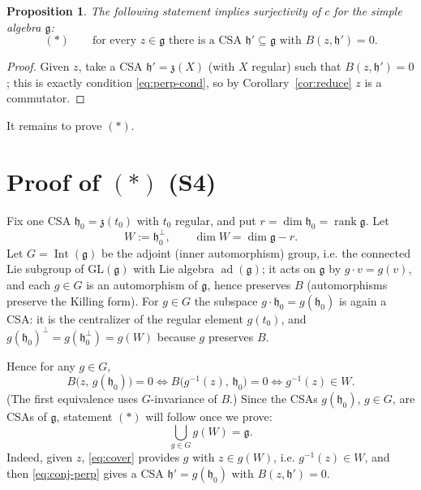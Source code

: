 \documentclass{amsart}
\newtheorem{proposition}{Proposition}
\theoremstyle{definition}
\begin{document}
\begin{proposition}\label{prop:S3}
The following statement implies surjectivity of $c$ for the simple algebra
$\mathfrak g$:
\[
  (\ast)\qquad \text{for every }z\in\mathfrak g\text{ there is a CSA }
  \mathfrak h'\subseteq\mathfrak g\text{ with } B(z,\mathfrak h')=0 .
\]
\end{proposition}

\begin{proof}
Given $z$, take a CSA $\mathfrak h'=\mathfrak z(X)$ (with $X$ regular) such that
$B(z,\mathfrak h')=0$; this is exactly condition \eqref{eq:perp-cond}, so by
Corollary~\ref{cor:reduce} $z$ is a commutator.
\end{proof}

It remains to prove $(\ast)$.

\section{Proof of $(\ast)$ (S4)}

Fix one CSA $\mathfrak h_0=\mathfrak z(t_0)$ with $t_0$ regular, and put
$r=\dim\mathfrak h_0=\operatorname{rank}\mathfrak g$. Let
\[
  W:=\mathfrak h_0^{\perp},\qquad \dim W=\dim\mathfrak g-r .
\]
Let $G=\operatorname{Int}(\mathfrak g)$ be the adjoint (inner automorphism) group,
i.e. the connected Lie subgroup of $\mathrm{GL}(\mathfrak g)$ with Lie algebra
$\operatorname{ad}(\mathfrak g)$; it acts on $\mathfrak g$ by
$g\cdot v=g(v)$, and each $g\in G$ is an automorphism of $\mathfrak g$, hence
preserves $B$ (automorphisms preserve the Killing form). For $g\in G$ the subspace
$g\cdot\mathfrak h_0=g(\mathfrak h_0)$ is again a CSA: it is the centralizer of the
regular element $g(t_0)$, and $g(\mathfrak h_0)^{\perp}=g(\mathfrak h_0^{\perp})
=g(W)$ because $g$ preserves $B$.

Hence for any $g\in G$,
\begin{equation}\label{eq:conj-perp}
  B\bigl(z,\,g(\mathfrak h_0)\bigr)=0
  \iff B\bigl(g^{-1}(z),\,\mathfrak h_0\bigr)=0
  \iff g^{-1}(z)\in W .
\end{equation}
(The first equivalence uses $G$-invariance of $B$.) Since the CSAs
$g(\mathfrak h_0)$, $g\in G$, are CSAs of $\mathfrak g$, statement $(\ast)$ will
follow once we prove:
\begin{equation}\label{eq:cover}
  \bigcup_{g\in G} g(W)=\mathfrak g .
\end{equation}
Indeed, given $z$, \eqref{eq:cover} provides $g$ with $z\in g(W)$, i.e.
$g^{-1}(z)\in W$, and then \eqref{eq:conj-perp} gives a CSA $\mathfrak h'=
g(\mathfrak h_0)$ with $B(z,\mathfrak h')=0$.
\end{document}
